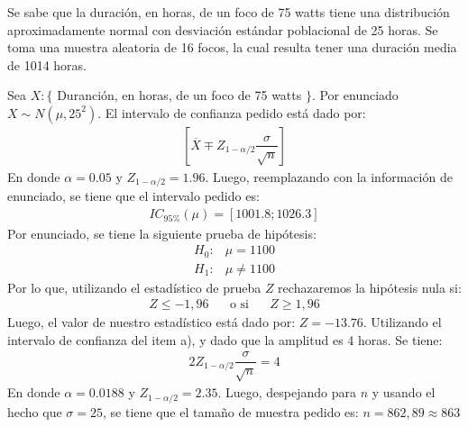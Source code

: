 
\question[30] Se sabe que la duraci\'on, en horas, de un foco de 75 watts tiene una distribuci\'on aproximadamente normal con desviaci\'on est\'andar poblacional de 25 horas. Se toma una muestra aleatoria de 16 focos, la cual resulta tener una duraci\'on media de 1014 horas. \noaddpoints {}

\begin{solution}
Sea $X: \{$ Duranci\'on, en horas, de un foco de 75 watts  $\}$. Por enunciado $X \sim N(\mu,25^2)$. El intervalo de confianza pedido est\'a dado por:\begin{align*}\left[ \overline{X} \mp Z_{1-\alpha /2}\dfrac{\sigma}{\sqrt{n}} \right] \end{align*}En donde $\alpha=0.05$ y $Z_{1-\alpha /2}=1.96$. Luego, reemplazando con la informaci\'on de enunciado, se tiene que el intervalo pedido es: \begin{align*}IC_{95\%}(\mu)=\left[1001.8;1026.3\right]\end{align*} Por enunciado, se tiene la siguiente prueba de hip\'otesis: \begin{align*}H_0:& \mu = 1100 \\H_1:& \mu \neq 1100\end{align*}Por lo que, utilizando el estad\'istico de prueba $Z$ rechazaremos la hip\'otesis nula si: \begin{align*}Z\leq -1,96 \hspace{20pt} \text{o si} \hspace{20pt}  Z\geq 1,96\end{align*} Luego, el valor de nuestro estad\'istico est\'a dado por: $Z=-13.76$. Utilizando el intervalo de confianza del item a), y dado que la amplitud es 4 horas. Se tiene: \begin{align*}2Z_{1-\alpha /2}\dfrac{\sigma}{\sqrt{n}}=4 \end{align*} En donde $\alpha=0.0188$ y $Z_{1-\alpha /2}=2.35$. Luego, despejando para $n$ y usando el hecho que $\sigma=25$, se tiene que el tama\~no de muestra pedido es: $n=862,89 \approx 863$ 
\end{solution}

